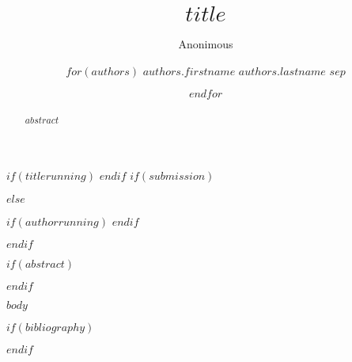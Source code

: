 \documentclass[runningheads,$lang$]{llncs}
\begin{document}
%
\title{$title$}
%
$if(titlerunning)$  $endif$
%
$if(submission)$
\author{Anonimous}
$else$
\author{
$for(authors)$
$authors.firstname$ $authors.lastname$ $sep$\and
$endfor$
}
$if(authorrunning)$  $endif$

$endif$

%
\maketitle
%

$if(abstract)$\begin{abstract} $abstract$ \end{abstract}$endif$ 



$body$
%
%
%
% 

% 
%

$if(bibliography)$

$endif$
\end{document}
